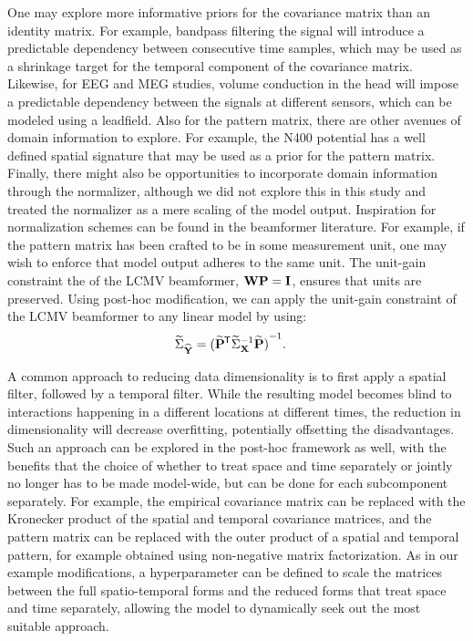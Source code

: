 \documentclass[a4paper]{vanvliet_paper}
\newcommand{\modcov}{\widetilde{\Sigma}_{\mat{X}}}
\newcommand{\modpat}{\widetilde{\mat{P}}}
\newcommand{\modnorm}{\widetilde{\Sigma}_{\emat{Y}}}
\begin{document}
One may explore more informative priors for the covariance matrix than an identity matrix.
For example, bandpass filtering the signal will introduce a predictable dependency between consecutive time samples, which may be used as a shrinkage target for the temporal component of the covariance matrix.
Likewise, for \gls{EEG} and \gls{MEG} studies, volume conduction in the head will impose a predictable dependency between the signals at different sensors, which can be modeled using a leadfield\cite{Hamalainen1993}.
Also for the pattern matrix, there are other avenues of domain information to explore.
For example, the N400 potential has a well defined spatial signature\cite{Kutas2011} that may be used as a prior for the pattern matrix.
Finally, there might also be opportunities to incorporate domain information through the normalizer, although we did not explore this in this study and treated the normalizer as a mere scaling of the model output.
Inspiration for normalization schemes can be found in the beamformer literature\cite{Sekihara2008}.
For example, if the pattern matrix has been crafted to be in some measurement unit, one may wish to enforce that model output adheres to the same unit.
The unit-gain constraint the of the \gls{LCMV} beamformer, $\mathbf{W}\mathbf{P}=\mathbf{I}$, ensures that units are preserved.
Using post-hoc modification, we can apply the unit-gain constraint of the \gls{LCMV} beamformer to any linear model by using:
\begin{align}
    \modnorm &= {(\modpat\trans \modcov^{-1} \modpat)}^{-1}.
\end{align}

A common approach to reducing data dimensionality is to first apply a spatial filter, followed by a temporal filter\cite{Blankertz2008b, Hoffmann2006, Rivet2009a}.
While the resulting model becomes blind to interactions happening in a different locations at different times, the reduction in dimensionality will decrease overfitting, potentially offsetting the disadvantages.
Such an approach can be explored in the post-hoc framework as well, with the benefits that the choice of whether to treat space and time separately or jointly no longer has to be made model-wide, but can be done for each subcomponent separately.
For example, the empirical covariance matrix can be replaced with the Kronecker product of the spatial and temporal covariance matrices, and the pattern matrix can be replaced with the outer product of a spatial and temporal pattern, for example obtained using non-negative matrix factorization\cite{Delis2016a}.
As in our example modifications, a hyperparameter can be defined to scale the matrices between the full spatio-temporal forms and the reduced forms that treat space and time separately, allowing the model to dynamically seek out the most suitable approach.
\end{document}
